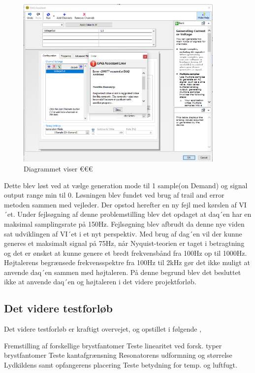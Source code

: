\begin{figure}[htb]
			\centering
				\includegraphics[width=4in]{FejlDAQAssistant}
				\caption{Diagrammet viser €€€}	
				\label{fig:FejlDAQAssistant}
			\end{figure}
			
			
Dette blev løst ved at vælge generation mode til 1 sample(on Demand) og signal output range min til 0. Løsningen blev fundet ved brug af trail and error metoden sammen med vejleder. Der opstod herefter en ny fejl med kørslen af VI´et. Under fejlsøgning af denne problemstilling blev det opdaget at daq´en har en maksimal samplingsrate på 150Hz. Fejlsøgning blev afbrudt da denne nye viden sat udviklingen af VI´et i et nyt perspektiv. Med brug af dag´en vil der kunne generes  et maksimalt signal på 75Hz, når Nyquist-teorien er taget i betragtning og det er ønsket at kunne genere et bredt frekvensbånd fra 100Hz op til 1000Hz. Højtalerens begrænsede frekvensspektre fra 100Hz til 2kHz  gør det ikke muligt at anvende daq´en sammen med højtaleren. 
På denne begrund blev det besluttet ikke at anvende daq´en og højtaleren i det videre projektforløb. 	

\subsection{Det videre testforløb}
Det videre testforløb er kraftigt overvejet, og opstillet i følgende  ,  



Fremstilling af forskellige brystfantomer
Teste linearitet ved forsk. typer brystfantomer
Teste kantafgrænsning
Resonatorens udformning og størrelse
Lydkildens samt opfangerens placering
Teste betydning for temp. og luftfugt.

